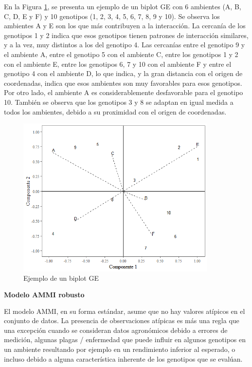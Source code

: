 En la Figura \ref{fig:fig311}, se presenta un ejemplo de un biplot GE con 6 ambientes (A, B, C, D, E y F) y 10 genotipos (1, 2, 3, 4, 5, 6, 7, 8, 9 y 10). Se observa los ambientes A y E son los que más contribuyen a la interacción. La cercanía de los genotipos 1 y 2 indica que esos genotipos tienen patrones de interacción similares, y a la vez, muy distintos a los del genotipo 4. Las cercanías entre el genotipo 9 y el ambiente A, entre el genotipo 5 con el ambiente C, entre los genotipos 1 y 2 con el ambiente E, entre los genotipos 6, 7 y 10 con el ambiente F y entre el genotipo 4 con el ambiente D, lo que indica, y la gran distancia con el origen de coordenadas, indica que esos ambientes son muy favorables para esos genotipos. Por otro lado, el ambiente A es considerablemente desfavorable para el genotipo 10. También se observa que los genotipos 3 y 8 se adaptan en igual medida a todos los ambientes, debido a su proximidad con el origen de coordenadas.


\begin{figure}[H]
	\begin{center}
		\includegraphics[width=10cm]{./Graficos/GE_biplot.png}
	\end{center}
	\caption{Ejemplo de un biplot GE}
	\label{fig:fig311}
\end{figure}



\textbf{Modelo AMMI robusto}

El modelo AMMI, en su forma estándar, asume que no hay valores atípicos en el conjunto de datos. La presencia de observaciones atípicas es más una regla que una excepción cuando se consideran datos agronómicos debido a errores de medición, algunas plagas / enfermedad que puede influir en algunos genotipos en un ambiente resultando por ejemplo en un rendimiento inferior al esperado, o incluso debido a alguna característica inherente de los genotipos que se evalúan.

